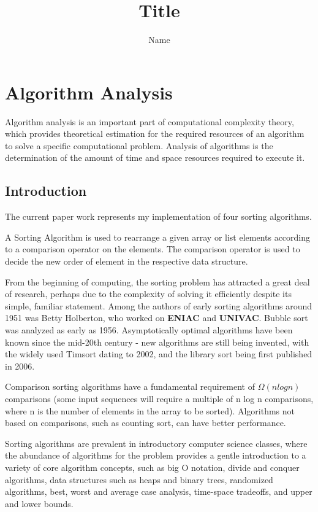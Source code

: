 \documentclass[a4paper, 12pt]{article}
\author{Name}
\title{Title}
\begin{document}
\pgfplotsset{compat=1.17}

\tableofcontents

\newpage

\section{Algorithm Analysis}

Algorithm analysis is an important part of computational complexity theory, which provides
theoretical estimation for the required resources of an algorithm to solve a specific computational problem. Analysis of algorithms is the determination of the amount of time and space
resources required to execute it.

\subsection{Introduction}

The current paper work represents my implementation of four sorting algorithms. 

\hfill \break
\indent A Sorting Algorithm is used to rearrange a given array or list elements according to a comparison operator on the elements. The comparison operator is used to decide the new order of element in the respective data structure.

From the beginning of computing, the sorting problem has attracted 
a great deal of research, perhaps due to the complexity of solving 
it efficiently despite its simple, familiar statement. Among the 
authors of early sorting algorithms around 1951 was Betty Holberton, 
who worked on \textbf{ENIAC} and \textbf{UNIVAC}. Bubble sort was analyzed as early 
as 1956. Asymptotically optimal algorithms have been known since the 
mid-20th century - new algorithms are still being invented, with the 
widely used Timsort dating to 2002, and the library sort being first 
published in 2006.

Comparison sorting algorithms have a fundamental requirement of $\Omega(nlogn)$
comparisons (some input sequences will require a multiple of n log n comparisons, 
where n is the number of elements in the array to be sorted). Algorithms not based 
on comparisons, such as counting sort, can have better performance.

Sorting algorithms are prevalent in introductory computer science classes, 
where the abundance of algorithms for the problem provides a gentle introduction 
to a variety of core algorithm concepts, such as big O notation, divide and conquer 
algorithms, data structures such as heaps and binary trees, randomized algorithms, 
best, worst and average case analysis, time-space tradeoffs, and upper and lower bounds.
\end{document}
